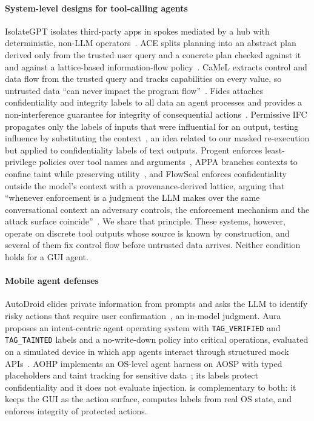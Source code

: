 \paragraph{System-level designs for tool-calling agents}
IsolateGPT isolates third-party apps in spokes mediated by a hub with deterministic, non-LLM operators~\cite{wu2025isolategpt}. ACE splits planning into an abstract plan derived only from the trusted user query and a concrete plan checked against it and against a lattice-based information-flow policy~\cite{li2026ace}. CaMeL extracts control and data flow from the trusted query and tracks capabilities on every value, so untrusted data ``can never impact the program flow''~\cite{debenedetti2025camel}. Fides attaches confidentiality and integrity labels to all data an agent processes and provides a non-interference guarantee for integrity of consequential actions~\cite{costa2025fides}. Permissive IFC propagates only the labels of inputs that were influential for an output, testing influence by substituting the context~\cite{siddiqui2025permissive}, an idea related to our masked re-execution but applied to confidentiality labels of text outputs. Progent enforces least-privilege policies over tool names and arguments~\cite{shi2025progent}, APPA branches contexts to confine taint while preserving utility~\cite{kravchenko2026appa}, and FlowSeal enforces confidentiality outside the model's context with a provenance-derived lattice, arguing that ``whenever enforcement is a judgment the LLM makes over the same conversational context an adversary controls, the enforcement mechanism and the attack surface coincide''~\cite{shim2026flowseal}. We share that principle. These systems, however, operate on discrete tool outputs whose source is known by construction, and several of them fix control flow before untrusted data arrives. Neither condition holds for a GUI agent.

\paragraph{Mobile agent defenses}
AutoDroid elides private information from prompts and asks the LLM to identify risky actions that require user confirmation~\cite{wen2024autodroid}, an in-model judgment. Aura proposes an intent-centric agent operating system with \texttt{TAG\_VERIFIED} and \texttt{TAG\_TAINTED} labels and a no-write-down policy into critical operations, evaluated on a simulated device in which app agents interact through structured mock APIs~\cite{zou2026aura}. AOHP implements an OS-level agent harness on AOSP with typed placeholders and taint tracking for sensitive data~\cite{zhao2026aohp}; its labels protect confidentiality and it does not evaluate injection. \PG{} is complementary to both: it keeps the GUI as the action surface, computes labels from real OS state, and enforces integrity of protected actions.

